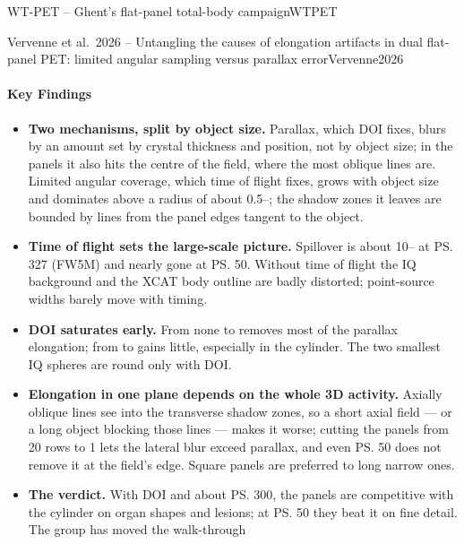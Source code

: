 \begin{programnote}{WT-PET -- Ghent's flat-panel total-body campaign}{WTPET}
\begin{papernote}{Vervenne et al.\ 2026 -- Untangling the causes of elongation artifacts in dual flat-panel PET: limited angular sampling versus parallax error}{Vervenne2026}
\paragraph{Key Findings}
\begin{itemize}
	\item \textbf{Two mechanisms, split by object size.} Parallax, which DOI
		fixes, blurs by an amount set by crystal thickness and position, not by
		object size; in the panels it also hits the centre of the field, where
		the most oblique lines are. Limited angular coverage, which time of
		flight fixes, grows with object size and dominates above a radius of
		about 0.5--; the shadow zones it leaves are bounded by lines from
		the panel edges tangent to the object.
	\item \textbf{Time of flight sets the large-scale picture.} Spillover is
		about 10-- at \ps{327} (FW5M) and nearly gone at
		\ps{50}. Without time of flight the IQ background and the XCAT body
		outline are badly distorted; point-source widths barely move with timing.
	\item \textbf{DOI saturates early.} From none to  removes most of the
		parallax elongation; from  to  gains little, especially
		in the cylinder. The two smallest IQ spheres are round only with DOI.
	\item \textbf{Elongation in one plane depends on the whole 3D activity.}
		Axially oblique lines see into the transverse shadow zones, so a short
		axial field --- or a long object blocking those lines --- makes it
		worse; cutting the panels from 20 rows to 1 lets the lateral blur exceed
		parallax, and even \ps{50} does not remove it at the field's edge.
		Square panels are preferred to long narrow ones.
	\item \textbf{The verdict.} With  DOI and about \ps{300}, the panels
		are competitive with the cylinder on organ shapes and lesions; at
		\ps{50} they beat it on fine detail. The group has moved the walk-through

\end{itemize}
\end{papernote}
\end{programnote}
